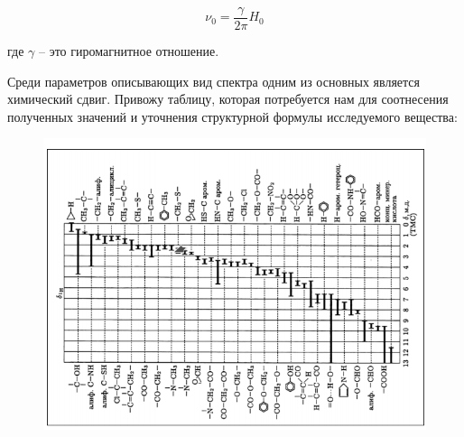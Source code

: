 \begin{equation}
\label{eq2}
\nu_0 = \frac{\gamma}{2\pi}H_0
\end{equation}

где $\gamma$ -- это гиромагнитное отношение.

Среди параметров описывающих вид спектра одним из основных является химический сдвиг.
Привожу таблицу, которая потребуется нам для соотнесения полученных значений и уточнения структурной формулы исследуемого вещества:

\begin{figure}[h!]
	\centering
	\includegraphics[width=0.55\linewidth]{tabl}
	\label{fig:tabl}
\end{figure}
